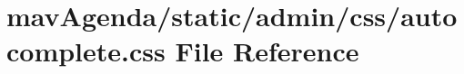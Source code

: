 \hypertarget{autocomplete_8css}{}\section{mav\+Agenda/static/admin/css/autocomplete.css File Reference}
\label{autocomplete_8css}
